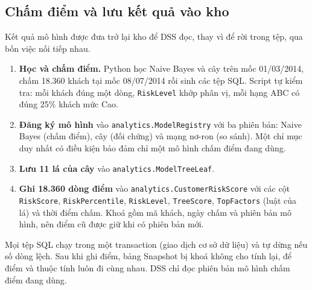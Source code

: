 \begin{table}[!htbp]
\centering
\caption{Ba khách minh hoạ tại mốc chấm điểm 08/07/2014}
\label{tab:minhhoa}
\footnotesize
\resizebox{\textwidth}{!}{}
\end{table}

\subsection{Chấm điểm và lưu kết quả vào kho}\label{sec:chamdiem}
Kết quả mô hình được đưa trở lại kho để DSS đọc, thay vì để rời trong tệp, qua bốn việc nối tiếp nhau.
\begin{enumerate}
    \item \textbf{Học và chấm điểm.} Python học Naive Bayes và cây trên mốc 01/03/2014, chấm 18.360 khách tại mốc 08/07/2014 rồi sinh các tệp SQL. Script tự kiểm tra: mỗi khách đúng một dòng, \texttt{RiskLevel} khớp phân vị, mỗi hạng ABC có đúng 25\% khách mức Cao.
    \item \textbf{Đăng ký mô hình} vào \texttt{analytics.\allowbreak ModelRegistry} với ba phiên bản: Naive Bayes (chấm điểm), cây (đối chứng) và mạng nơ-ron (so sánh). Một chỉ mục duy nhất có điều kiện bảo đảm chỉ một mô hình chấm điểm đang dùng.
    \item \textbf{Lưu 11 lá của cây} vào \texttt{analytics.\allowbreak ModelTreeLeaf}.
    \item \textbf{Ghi 18.360 dòng điểm} vào \texttt{analytics.\allowbreak CustomerRiskScore} với các cột \texttt{RiskScore}, \texttt{RiskPercentile}, \texttt{RiskLevel}, \texttt{TreeScore}, \texttt{TopFactors} (luật của lá) và thời điểm chấm. Khoá gồm mã khách, ngày chấm và phiên bản mô hình, nên điểm cũ được giữ khi có phiên bản mới.
\end{enumerate}
Mọi tệp SQL chạy trong một transaction (giao dịch cơ sở dữ liệu) và tự dừng nếu số dòng lệch. Sau khi ghi điểm, bảng Snapshot bị khoá không cho tính lại, để điểm và thuộc tính luôn đi cùng nhau. DSS chỉ đọc phiên bản mô hình chấm điểm đang dùng.

